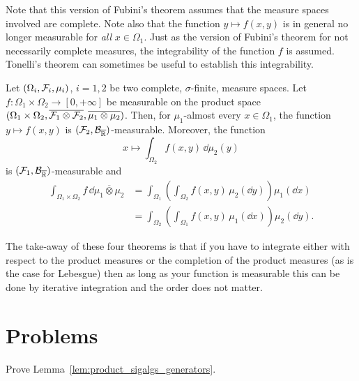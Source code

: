 Note that this version of Fubini's theorem assumes that the measure spaces involved are complete. 
Note also that the function $y \mapsto f(x,y)$ is in general no longer measurable for \emph{all} $x \in \Omega_1$. Just as the version of Fubini's theorem for not necessarily complete measures, the integrability of the function $f$ is assumed. Tonelli's theorem can sometimes be useful to establish this integrability.

\begin{theorem}
	Let $(\Omega_i, \mathcal F_i, \mu_i)$, $i=1,2$ be two complete, $\sigma$-finite, measure spaces. 
	Let $f : \Omega_1 \times \Omega_2 \to [0,+\infty]$ be measurable on the product space $(\Omega_1 \times \Omega_2, \overline{\mathcal F_1 \otimes \mathcal F_2}, \overline{\mu_1 \otimes \mu_2})$. Then, for $\mu_1$-almost every $x \in \Omega_1$, the function $y \mapsto f(x, y)$ is $(\mathcal F_2,\mathcal B_{\overline{\mathbb R}})$-measurable. Moreover, the function 
	\[
	x \mapsto \int_{\Omega_2} f(x,y)\, \dd \mu_2(y)
	\]
	is $(\mathcal F_1,\mathcal B_{\overline{\mathbb R}})$-measurable and
	\[
	\begin{split}
	\int_{\Omega_1 \times \Omega_2} f \,\dd \overline{\mu_1 \otimes \mu_2} 
	&= \int_{\Omega_1} \left( \int_{\Omega_2 } f(x,  y ) \,\mu_2(\dd y) \right) \mu_1(\dd x)\\
	&= \int_{\Omega_2} \left( \int_{\Omega_1} f(x, y)  \,\mu_1(\dd x) \right) \mu_2(\dd y).
	\end{split}
	\] 	
\end{theorem}

The take-away of these four theorems is that if you have to integrate either with respect to the product measures or the completion of the product measures (as is the case for Lebesgue) then as long as your function is measurable this can be done by iterative integration and the order does not matter.


\section{Problems}

\begin{problem}\label{prb:product_sigalgs_generators}
Prove Lemma~\ref{lem:product_sigalgs_generators}.
\end{problem}

